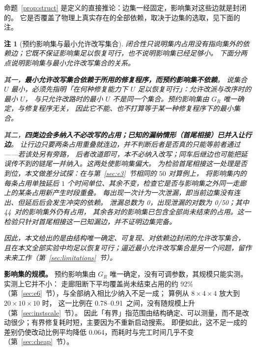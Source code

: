 \documentclass[manuscript,screen,review]{acmart}
\newcommand{\NPairs}{50}
\newcommand{\ClosureAliveFrac}{92\%}
\newcommand{\RAStabMean}{0.064}      %
\newcommand{\ScaleJobsHi}{20}
\newcommand{\ScaleMachHi}{10}
\newcommand{\ScaleCloAliveLo}{0.78}  %
\newcommand{\ScaleCloAliveHi}{0.91}  %
\newcommand{\ProbeLeakPairs}{0/50}
\newcommand{\ProbeLeaks}{0}
\newcommand{\ProbeOutsidePairs}{44}  %
\newtheorem{remark}{注}
\begin{document}
命题~\ref{prop:struct} 是定义的直接推论：边集一经固定，影响集对这些边就是封闭的。
它是否覆盖了物理上真实存在的全部依赖，取决于边集的选取，见下面的注。

\begin{remark}[预约影响集与最小允许改写集合]
\label{rem:minimality}
闭合性只说明集内占用没有指向集外的依赖边；它既不保证影响集足以恢复可行，也不说明影响集已经足够小。
下面分两点说明影响集与最小允许改写集合的关系。

其一，\textbf{最小允许改写集合依赖于所用的修复程序，而预约影响集不依赖}。
说集合 \(U\) 最小，必须先指明「在何种修复能力下 \(U\) 足以恢复可行」：允许改派与改序时的最小 \(U\)，
与只允许改路时的最小 \(U\) 不是同一个集合。预约影响集由 \(G_R\) 唯一确定，与修复程序无关，
因此它不能、也不打算等于某一种修复程序下的最小集合。

其二，\textbf{四类边会多纳入不必改写的占用；已知的漏纳情形（首尾相接）已并入让行边}。
让行边只要两条占用重叠就连边，并不判断后者是否\emph{真的}只能等前者通过——若该处另有旁路，
后者改道即可，本不必纳入改写；同车后继边也可能把延误传不到的链尾一并纳入。这两处使影响集偏大。
为检验首尾相接这一处理是否到位，本文做\emph{差分试探}：在与第~\ref{sec:e3}~节相同的 \(\NPairs\) 对算例上，
将影响集内的每条占用单独延后 \(1\) 个时间单位、其余不变，检查它是否与影响集之外同一走廊上的某条占用新产生时段重叠。
每出现一次计为一次泄漏，即当前边集没有连出、但延后后会发生冲突的依赖。
泄漏总数为 \ProbeLeaks，出现泄漏的对数为 \ProbeLeakPairs；其中 \ProbeOutsidePairs\ 对的影响集外仍有占用，
其余各对的影响集已包含全部尚未结束的占用。这一检验只针对首尾相接这一已知漏边，并不证明边集完备。

因此，本文给出的是由结构唯一确定、可复现、对依赖边封闭的允许改写集合，
且在本文全部实验中均足以恢复可行；逼近最小允许改写集合是另一个问题，留作未来工作（第~\ref{sec:limitations}~节）。
\end{remark}

\textbf{影响集的规模。}
\label{sec:structure}
预约影响集由 \(G_R\) 唯一确定，没有可调参数，其规模只能实测。实测上它并不小：
走廊阻断下平均覆盖尚未结束占用的约 \ClosureAliveFrac（第~\ref{sec:e6}~节），与全部纳入相比少纳入不足一成；
算例从 \(8\times4\times4\) 放大到 \(\ScaleJobsHi\times\ScaleMachHi\times\ScaleMachHi\) 时，
这一比例在 \ScaleCloAliveLo--\ScaleCloAliveHi\ 之间，没有随规模上升（第~\ref{sec:instscale}~节）。
因此「有界」指范围由结构确定、可以测量，而不是改动很少；有界修复耗时短，主要因为不重新启动搜索。
即便如此，这不足一成的差别仍使改动比例平均降低 \RAStabMean，而耗时与完工时间几乎不变（第~\ref{sec:cheap}~节）。
\end{document}
